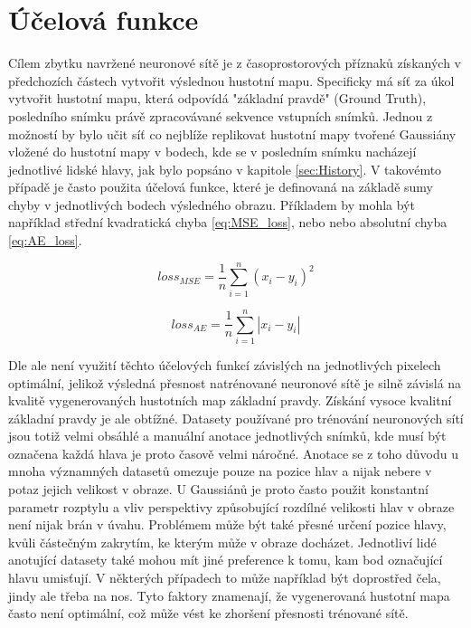 \section{Účelová funkce}

Cílem zbytku navržené neuronové sítě je z časoprostorových příznaků získaných v předchozích částech vytvořit výslednou hustotní mapu.
Specificky má síť za úkol vytvořit hustotní mapu, která odpovídá "základní pravdě" (Ground Truth), posledního snímku právě zpracovávané sekvence vstupních snímků.
Jednou z možností by bylo učit síť co nejblíže replikovat hustotní mapy tvořené Gaussiány vložené do hustotní mapy v bodech, kde se v posledním snímku nacházejí jednotlivé lidské hlavy, jak bylo popsáno v kapitole \ref{sec:History}.
V takovémto případě je často použita účelová funkce, které je definovaná na základě sumy chyby v jednotlivých bodech výsledného obrazu. Příkladem by mohla být například střední kvadratická chyba \ref{eq:MSE_loss}, nebo nebo absolutní chyba \ref{eq:AE_loss}.

\begin{equation}
loss_{MSE} = \frac{1}{n} \sum_{i=1}^{n} (x_i - y_i)^2
\label{eq:MSE_loss}
\end{equation}

\begin{equation}
loss_{AE} = \frac{1}{n} \sum_{i=1}^{n} |x_i - y_i|
\label{eq:AE_loss}
\end{equation}

Dle \cite{Bayesian_Crowd_Counting, DM_Count} ale není využití těchto účelových funkcí závislých na jednotlivých pixelech optimální, jelikož výsledná přesnost natrénované neuronové sítě je silně závislá na kvalitě vygenerovaných hustotních map základní pravdy.
Získání vysoce kvalitní základní pravdy je ale obtížné.
Datasety používané pro trénování neuronových sítí jsou totiž velmi obsáhlé a manuální anotace jednotlivých snímků, kde musí být označena každá hlava je proto časově velmi náročné.
Anotace se z toho důvodu u mnoha významných datasetů omezuje pouze na pozice hlav a nijak nebere v potaz jejich velikost v obraze. U Gaussiánů je proto často použit konstantní parametr rozptylu a vliv perspektivy způsobující rozdílné velikosti hlav v obraze není nijak brán v úvahu.
Problémem může být také přesné určení pozice hlavy, kvůli částečným zakrytím, ke kterým může v obraze docházet.
Jednotliví lidé anotující datasety také mohou mít jiné preference k tomu, kam bod označující hlavu umisťují. V některých případech to může například být doprostřed čela, jindy ale třeba na nos.
Tyto faktory znamenají, že vygenerovaná hustotní mapa často není optimální, což může vést ke zhoršení přesnosti trénované sítě.

